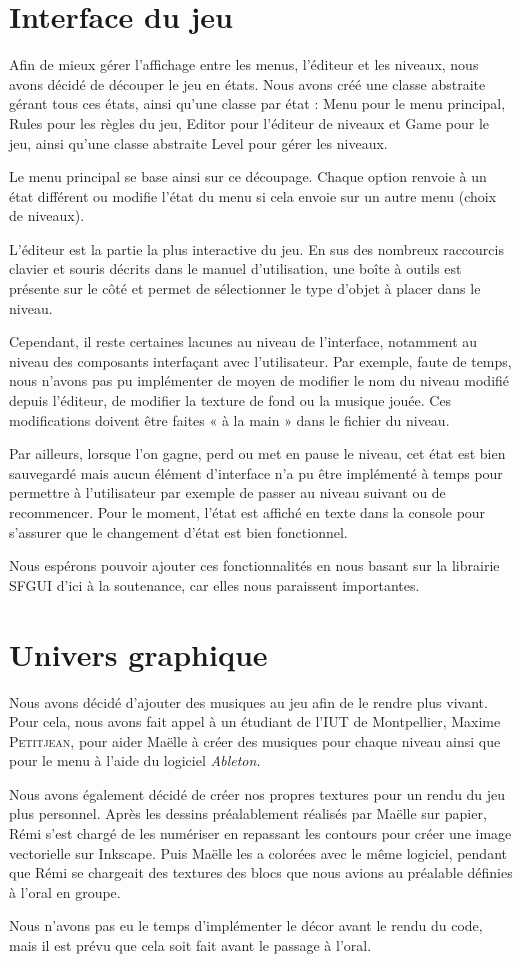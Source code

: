 \section{Interface du jeu}

Afin de mieux gérer l'affichage entre les menus, l'éditeur et les
niveaux, nous avons décidé de découper le jeu en états. Nous avons
créé une classe abstraite gérant tous ces états, ainsi qu'une
classe par état : Menu pour le menu principal, Rules pour les
règles du jeu, Editor pour l'éditeur de niveaux et Game pour
le jeu, ainsi qu'une classe abstraite Level pour gérer les niveaux.

Le menu principal se base ainsi sur ce découpage. Chaque option
renvoie à un état différent ou modifie l'état du menu si cela
envoie sur un autre menu (choix de niveaux).

L'éditeur est la partie la plus interactive du jeu. En sus des
nombreux raccourcis clavier et souris décrits dans le manuel
d'utilisation, une boîte à outils est présente sur le côté
et permet de sélectionner le type d'objet à placer dans le niveau.

Cependant, il reste certaines lacunes au niveau de l'interface,
notamment au niveau des composants interfaçant avec l'utilisateur.
Par exemple, faute de temps, nous n'avons pas pu implémenter de
moyen de modifier le nom du niveau modifié depuis l'éditeur,
de modifier la texture de fond ou la musique jouée. Ces modifications
doivent être faites « à la main » dans le fichier du niveau.

Par ailleurs, lorsque l'on gagne, perd ou met en pause le niveau,
cet état est bien sauvegardé mais aucun élément d'interface n'a
pu être implémenté à temps pour permettre à l'utilisateur par
exemple de passer au niveau suivant ou de recommencer. Pour le moment,
l'état est affiché en texte dans la console pour s'assurer
que le changement d'état est bien fonctionnel.

Nous espérons pouvoir ajouter ces fonctionnalités en nous basant
sur la librairie SFGUI d'ici à la soutenance, car elles nous
paraissent importantes. \cite{develop-sfgui}

\section{Univers graphique}

Nous avons décidé d'ajouter des musiques au jeu afin de le rendre
plus vivant. Pour cela, nous avons fait appel à un étudiant de
l'IUT de Montpellier, Maxime \textsc{Petitjean}, pour aider Maëlle
à créer des musiques pour chaque niveau ainsi que pour le menu
à l'aide du logiciel \emph{Ableton.}

Nous avons également décidé de créer nos propres textures pour un
rendu du jeu plus personnel. Après les dessins préalablement
réalisés par Maëlle sur papier, Rémi s'est chargé de les numériser
en repassant les contours pour créer une image vectorielle sur
Inkscape. Puis Maëlle les a colorées avec le même logiciel,
pendant que Rémi se chargeait des textures des blocs que nous
avions au préalable définies à l'oral en groupe.

Nous n'avons pas eu le temps d'implémenter le décor avant le rendu
du code, mais il est prévu que cela soit fait avant le passage à l'oral.
